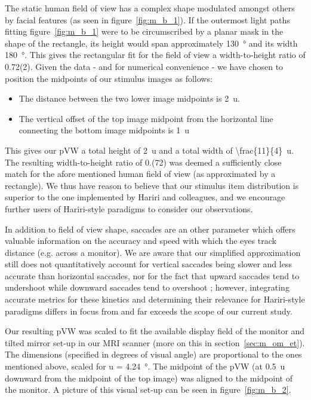 	    The static human field of view has a complex shape modulated amongst others by facial features (as seen in figure~\ref{fig:m_b_1}).
	    If the outermost light paths fitting figure~\ref{fig:m_b_1} were to be circumscribed by a planar mask in the shape of the rectangle, its height would span approximately \SI{130}{\degree} and its width \SI{180}{\degree}.
	    This gives the rectangular fit for the field of view a width-to-height ratio of 0.72(2).
	    Given the data - and for numerical convenience - we have chosen to position the midpoints of our stimulus images as follows:
	    \begin{itemize}
		\item The distance between the two lower image midpoints is \SI{2}{u}.
		\item The vertical offset of the top image midpoint from the horizontal line connecting the bottom image midpoints is \SI{1}{u}
	    \end{itemize}
	    This gives our pVW a total height of \SI{2}{u} and a total width of \SI[parse-numbers = false]{\frac{11}{4}}{u}.
	    The resulting width-to-height ratio of 0.(72) was deemed a sufficiently close match for the afore mentioned human field of view (as approximated by a rectangle).
	    We thus have reason to believe that our stimulus item distribution is superior to the one implemented by Hariri and colleagues, and we encourage further users of Hariri-style paradigms to consider our observations.  
	    
	    In addition to field of view shape, saccades are an other parameter which offers valuable information on the accuracy and speed with which the eyes track distance (e.g. across a monitor).
	    We are aware that our simplified approximation still does not quantitatively account for vertical saccades being slower \citep{TerryBahill1975} and less accurate \citep{Collewijn1988} than horizontal saccades, 
	    nor for the fact that upward saccades tend to undershoot while downward saccades tend to overshoot \citep{Collewijn1988};
	    however, integrating accurate metrics for these kinetics and determining their relevance for Hariri-style paradigms differs in focus from and far exceeds the scope of our current study.
	    
	    Our resulting pVW was scaled to fit the available display field of the monitor and tilted mirror set-up in our MRI scanner (more on this in section~\ref{sec:m_om_et}).
	    The dimensions (specified in degrees of visual angle) are proportional to the ones mentioned above, scaled for u = \SI{4.24}{\degree}.
	    The midpoint of the pVW (at \SI{0.5}{u} downward from the midpoint of the top image) was aligned to the midpoint of the monitor.
	    A picture of this visual set-up can be seen in figure~\ref{fig:m_b_2}.
	    
